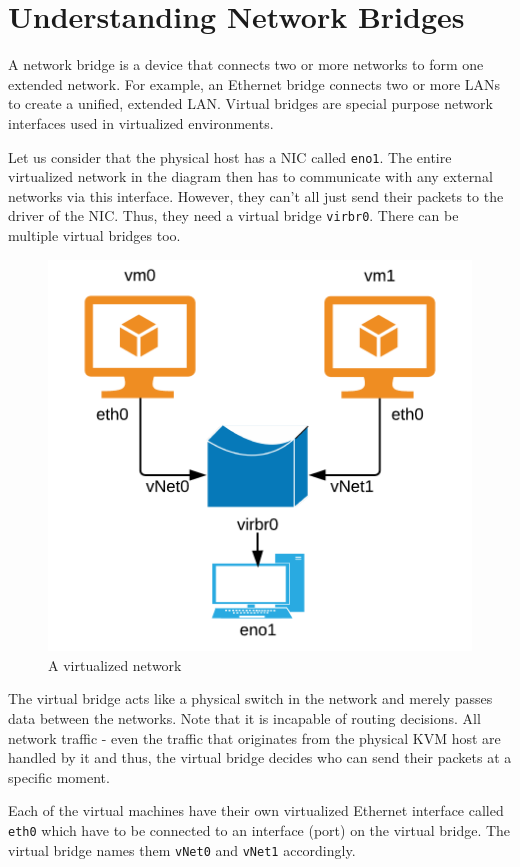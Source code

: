 
\usepackage{minted}
\usepackage{booktabs}


	
	
	\section{Understanding Network Bridges}
	A network bridge is a device that connects two or more networks to form one extended network. For example, an Ethernet bridge connects two or more LANs to create a unified, extended LAN. Virtual bridges are special purpose network interfaces used in virtualized environments. 
	
	Let us consider that the physical host has a NIC called \verb|eno1|. The entire virtualized network in the diagram then has to communicate with any external networks via this interface. However, they can't all just send their packets to the driver of the NIC. Thus, they need a virtual bridge \verb|virbr0|. There can be multiple virtual bridges too. 
	
	\begin{figure}[H]
		\centering
		\includegraphics[width=0.5\linewidth]{Mod2/chapters/2.6.b}
		\caption{A virtualized network}
		\label{fig:2}
	\end{figure}
	
	\noindent	
	The virtual bridge acts like a physical switch in the network and merely passes data between the networks. Note that it is incapable of routing decisions. All network traffic - even the traffic that originates from the physical KVM host are handled by it and thus, the virtual bridge decides who can send their packets at a specific moment. 
	
	Each of the virtual machines have their own virtualized Ethernet interface called \verb|eth0| which have to be connected to an interface (port) on the virtual bridge. The virtual bridge names them \verb|vNet0| and \verb|vNet1| accordingly. 
	
